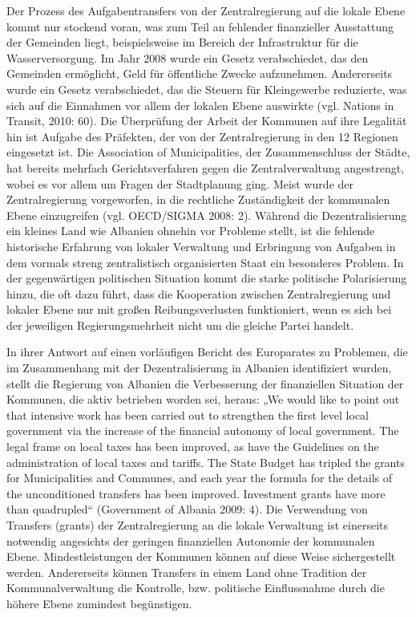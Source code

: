 Der Prozess des Aufgabentransfers von der Zentralregierung auf die lokale Ebene kommt nur stockend voran, was zum Teil an fehlender finanzieller Ausstattung der Gemeinden liegt, beispielsweise im Bereich der Infrastruktur für die Wasserversorgung. Im Jahr 2008 wurde ein Gesetz verabschiedet, das den Gemeinden ermöglicht, Geld für öffentliche Zwecke aufzunehmen. Andererseits wurde ein Gesetz verabschiedet, das die Steuern für Kleingewerbe reduzierte, was sich auf die Einnahmen vor allem der lokalen Ebene auswirkte (vgl. Nations in Transit, 2010: 60). Die Überprüfung der Arbeit der Kommunen auf ihre Legalität hin ist Aufgabe des Präfekten, der von der Zentralregierung in den 12 Regionen eingesetzt ist. Die Association of Municipalities, der Zusammenschluss der Städte, hat bereits mehrfach Gerichtsverfahren gegen die Zentralverwaltung angestrengt, wobei es vor allem um Fragen der Stadtplanung ging. Meist wurde der Zentralregierung vorgeworfen, in die rechtliche Zuständigkeit der kommunalen Ebene einzugreifen (vgl. OECD/SIGMA 2008: 2). Während die Dezentralisierung ein kleines Land wie Albanien ohnehin vor Probleme stellt, ist die fehlende historische Erfahrung von lokaler Verwaltung und Erbringung von Aufgaben in dem vormals streng zentralistisch organisierten Staat ein besonderes Problem. In der gegenwärtigen politischen Situation kommt die starke politische Polarisierung hinzu, die oft dazu führt, dass die Kooperation zwischen Zentralregierung und lokaler Ebene nur mit großen Reibungsverlusten funktioniert, wenn es sich bei der jeweiligen Regierungsmehrheit nicht um die gleiche Partei handelt.\par
In ihrer Antwort auf einen vorläufigen Bericht des Europarates zu Problemen, die im Zusammenhang mit der Dezentralisierung in Albanien identifiziert wurden, stellt die Regierung von Albanien die Verbesserung der finanziellen Situation der Kommunen, die aktiv betrieben worden sei, heraus: „We would like to point out that intensive work has been carried out to strengthen the first level local government via the increase of the financial autonomy of local government. The legal frame on local taxes has been improved, as have the Guidelines on the administration of local taxes and tariffs. The State Budget has tripled the grants for Municipalities and Communes, and each year the formula for the details of the unconditioned transfers has been improved. Investment grants have more than quadrupled“ (Government of Albania 2009: 4). Die Verwendung von Transfers (grants) der Zentralregierung an die lokale Verwaltung ist einerseits notwendig angesichts der geringen finanziellen Autonomie der kommunalen Ebene. Mindestleistungen der Kommunen können auf diese Weise sichergestellt werden. Andererseits können Transfers in einem Land ohne Tradition der Kommunalverwaltung die Kontrolle, bzw. politische Einflussnahme durch die höhere Ebene zumindest begünstigen. \par 
